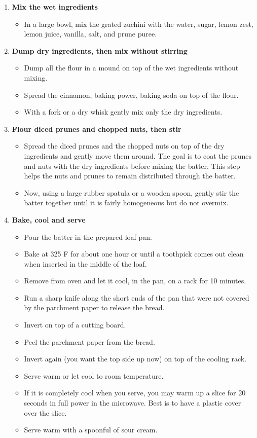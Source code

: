 \documentclass[11pt,letterpaper]{article}
\begin{document}
\begin{description}
\begin{enumerate}
	\item {\bf Mix the wet ingredients}
	\begin{itemize}
	\item In a large bowl, mix the grated zuchini with the water, sugar, lemon zest, lemon juice, vanilla, salt, and prune puree.
	\end{itemize}
	
	\item {\bf Dump dry ingredients, then mix without stirring}
	\begin{itemize}
	\item Dump all the flour in a mound on top of the wet ingredients without mixing.
	\item Spread the cinnamon, baking power, baking soda on top of the flour.
	\item With a fork or a dry whisk gently mix only the dry ingredients.
	\end{itemize}
	
	\item {\bf Flour diced prunes and chopped nuts, then stir}
	\begin{itemize}
	\item Spread the diced prunes and the chopped nuts on top of the dry ingredients and gently move them around. The goal is to coat the prunes and nuts with the dry ingredients before mixing the batter. This step helps the nuts and prunes to remain distributed through the batter.
	\item Now, using a large rubber spatula or a wooden spoon, gently stir the batter together until it is fairly homogeneous but do not overmix.
	\end{itemize}
		
	\item {\bf Bake, cool and serve}
	\begin{itemize}
	\item Pour the batter in the prepared loaf pan.
	\item Bake at 325 F for about one hour or until a toothpick comes out clean when inserted in the middle of the loaf. 
	\item Remove from oven and let it cool, in the pan,  on a rack for 10 minutes.
	\item Run a sharp knife along the short ends of the pan that were not covered by the parchment paper to release the bread.
	\item Invert on top of a cutting board.
	\item Peel the parchment paper from the bread.
	\item Invert again (you want the top side up now) on top of the cooling rack. 
	\item Serve warm or let cool to room temperature.
	\item If it is completely cool when you serve, you may warm up a slice for 20 seconds in full power in the microwave. Best is to have a plastic cover over the slice. 
	\item Serve warm with a spoonful of sour cream.
	\end{itemize}
	
	\end{enumerate}
\end{description}
\end{document}
